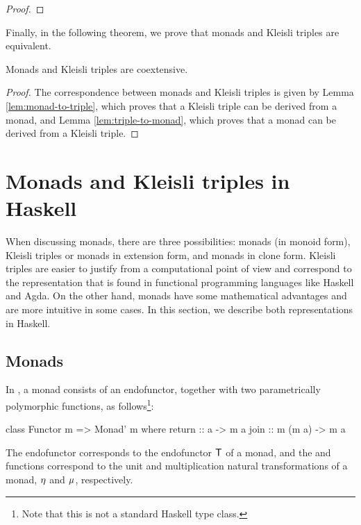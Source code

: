 \begin{lemma}
\begin{proof}
  \end{proof}

\end{lemma}

Finally, in the following theorem, we prove that monads and Kleisli
triples are equivalent.

\begin{theorem}
  \label{the:monad-triple}

  Monads and Kleisli triples are coextensive.

  \begin{proof}

    The correspondence between monads and Kleisli triples is given by
    Lemma \ref{lem:monad-to-triple}, which proves that a Kleisli
    triple can be derived from a monad, and Lemma
    \ref{lem:triple-to-monad}, which proves that a monad can be
    derived from a Kleisli triple.

  \end{proof}

\end{theorem}

\section{Monads and Kleisli triples in Haskell}
\label{sec:monads-haskell}

When discussing monads, there are three possibilities: monads (in
monoid form), Kleisli triples or monads in extension form, and monads
in clone form. Kleisli triples are easier to justify from a
computational point of view and correspond to the representation that
is found in functional programming languages like Haskell and Agda. On
the other hand, monads have some mathematical advantages and are more
intuitive in some cases. In this section, we describe both
representations in Haskell.

\subsection*{Monads}

In \hask, a monad consists of an endofunctor, together with two
parametrically polymorphic functions, as follows\footnote{Note that
  this is not a standard Haskell type class.}:
\begin{codehaskell}
class Functor m => Monad' m where
  return :: a -> m a
  join   :: m (m a) -> m a
\end{codehaskell}
The endofunctor  corresponds to the endofunctor
$\mathsf{T}$ of a monad, and the  and
 functions correspond to the unit and multiplication
natural transformations of a monad, $\eta$ and $\mu$,
respectively.

